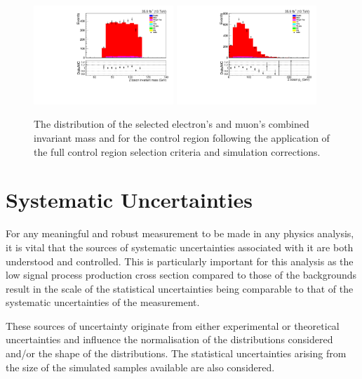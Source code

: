 \begin{figure}[tbp]
\centering
\includegraphics[width=0.47\textwidth]{figs/background-estimation/plots/unblinded/ttbar_control/zPairMass_SingleTop_wMass_emu.pdf}
\includegraphics[width=0.47\textwidth]{figs/background-estimation/plots/unblinded/ttbar_control/zPairPt_SingleTop_wMass_emu.pdf}
\caption{
The distribution of the selected electron's and muon's combined invariant mass and \pt for the \ttbar control region following the application of the full control region selection criteria and simulation corrections.
}
\label{fig:ttbarCR_leptons}
\end{figure}


\section{Systematic Uncertainties}\label{sec:systematics}
For any meaningful and robust measurement to be made in any physics analysis, it is vital that the sources of systematic uncertainties associated with it are both understood and controlled.
This is particularly important for this analysis as the low signal process production cross section compared to those of the backgrounds result in the scale of the statistical uncertainties being comparable to that of the systematic uncertainties of the measurement.

These sources of uncertainty originate from either experimental or theoretical uncertainties and influence the normalisation of the distributions considered and/or the shape of the distributions.
The statistical uncertainties arising from the size of the simulated samples available are also considered.

